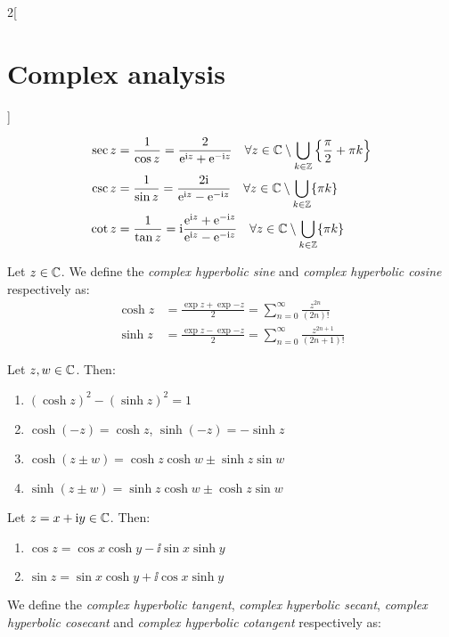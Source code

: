\documentclass[../../../main_math.tex]{subfiles}
\begin{document}
\begin{multicols}{2}[\section{Complex analysis}]
\begin{definition}
\begin{align*}
      \sec z & = \frac{1}{\cos z}=\frac{2}{\mathrm{e}^{\mathrm{i} z}+\mathrm{e}^{-\mathrm{i} z}}\quad \forall z\in\mathbb{C}\setminus\bigcup_{k\in\mathbb{Z}}\left\{\frac{\pi}{2}+\pi k\right\}                                 \\
      \csc z & = \frac{1}{\sin z}=\frac{2\mathrm{i}}{\mathrm{e}^{\mathrm{i} z}-\mathrm{e}^{-\mathrm{i} z}}\quad\forall z\in\mathbb{C}\setminus\bigcup_{k\in\mathbb{Z}}\{\pi k\}                                                        \\
      \cot z & = \frac{1}{\tan z}=\mathrm{i}\frac{\mathrm{e}^{\mathrm{i} z}+\mathrm{e}^{-\mathrm{i} z}}{\mathrm{e}^{\mathrm{i} z}-\mathrm{e}^{-\mathrm{i} z}}\quad\forall z\in\mathbb{C}\setminus\bigcup_{k\in\mathbb{Z}}\{\pi k\}
    \end{align*}
  \end{definition}
  \begin{definition}
    Let $z\in \mathbb{C}$. We define the \emph{complex hyperbolic sine} and \emph{complex hyperbolic cosine} respectively as:
    \begin{align*}
      \cosh z & =\frac{\exp{z}+\exp{-z}}{2}=\sum_{n=0}^\infty\frac{z^{2n}}{(2n)!}     \\
      \sinh z & =\frac{\exp{z}-\exp{-z}}{2}=\sum_{n=0}^\infty\frac{z^{2n+1}}{(2n+1)!}
    \end{align*}
  \end{definition}
  \begin{proposition}
    Let $z,w\in\mathbb{C}$. Then:
    \begin{enumerate}
      \item ${\left(\cosh z\right)}^2-{\left(\sinh z\right)}^2=1$
      \item $\cosh(-z)=\cosh z$, $\sinh(-z)=-\sinh z$
      \item $\cosh{(z \pm w)} = \cosh z \cosh w \pm \sinh z \sin w$
      \item $\sinh{(z \pm w)} = \sinh z \cosh w \pm \cosh z \sin w$
    \end{enumerate}
  \end{proposition}
  \begin{proposition}
    Let $z=x+\mathrm{i} y\in \mathbb{C}$. Then:
    \begin{enumerate}
      \item $\cos z = \cos x \cosh y - \ii \sin x \sinh y$
      \item $\sin z = \sin x \cosh y + \ii \cos x \sinh y$
    \end{enumerate}
  \end{proposition}
  \begin{definition}
    We define the \emph{complex hyperbolic tangent}, \emph{complex hyperbolic secant}, \emph{complex hyperbolic cosecant} and \emph{complex hyperbolic cotangent} respectively as:

\end{definition}
\end{multicols}
\end{document}
